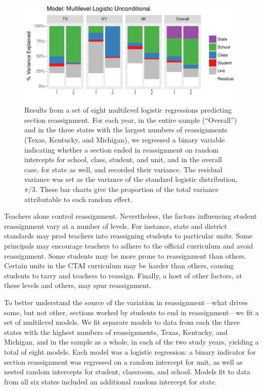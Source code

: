 \documentclass[notitlepage,12pt]{jedm}\usepackage[]{graphicx}\usepackage[]{color}
\makeatletter
\def\maxwidth{ %
  \ifdim\Gin@nat@width>\linewidth
    \linewidth
  \else
    \Gin@nat@width
  \fi
}
\makeatother
\begin{document}
\begin{figure}
  \centering

\includegraphics[width=\maxwidth]{figure/vcs-1} 

\caption{Results from a set of eight multilevel logistic regressions
  predicting section reassignment. For each year, in the entire sample (``Overall'')
  and in the three states with the largest numbers of reassignments (Texas,
  Kentucky, and Michigan), we regressed a binary variable indicating
  whether a section ended in reassignment on random intercepts for
  school, class, student, and unit, and in the overall case, for state
  as well, and recorded their variance. The residual variance was set
  as the variance of the standard logistic distribution,
  $\pi/3$. These bar charts give the proportion of the total variance
  attributable to each random effect.}
\label{fig:vc}
\end{figure}
Teachers alone control reassignment.
Nevertheless, the factors influencing student reassignment vary at a
number of levels.
For instance, state and district standards may prod teachers into
reassigning students to particular units.
Some principals may encourage teachers to adhere to the official
curriculum and avoid reassignment.
Some students may be more prone to reassignment than others.
Certain units in the CTAI curriculum may be harder than others,
causing students to tarry and teachers to reassign.
Finally, a host of other factors, at these levels and others, may spur reassignment.

To better understand the source of the variation in
reassignment---what drives some, but not other, sections worked by
students to end in
reassignment---we fit a set of multilevel models.
We fit separate models to data from each the three states with the highest numbers of reassignments, Texas,
Kentucky, and Michigan, and in the sample as a whole, in each of the
two study years, yielding a total of eight models.
Each model was a logistic regression: a binary indicator for section
reassignment was regressed on a random intercept for unit, as well as
nested random intercepts for student, classroom, and school.
Models fit to data from all six states included an additional random
intercept for state.
\end{document}
